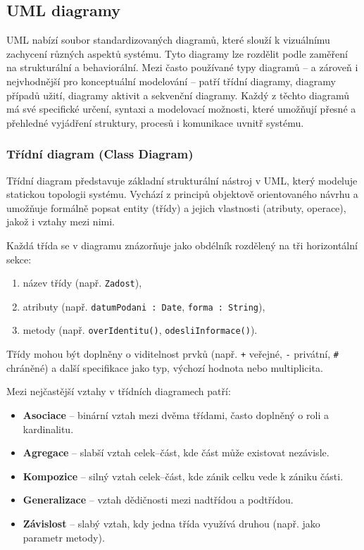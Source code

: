 \subsection{UML diagramy}
\label{sec:uml-diagramy}

UML nabízí soubor standardizovaných diagramů, které slouží k vizuálnímu zachycení různých aspektů systému. Tyto diagramy lze rozdělit podle zaměření na strukturální a  behaviorální. Mezi často používané typy diagramů – a zároveň i nejvhodnější pro konceptuální modelování – patří třídní diagramy, diagramy případů užití, diagramy aktivit a sekvenční diagramy. Každý z těchto diagramů má své specifické určení, syntaxi a modelovací možnosti, které umožňují přesné a přehledné vyjádření struktury, procesů i komunikace uvnitř systému. \cite{PerglUML, Koc2021}


\subsubsection{Třídní diagram (Class Diagram)}
\label{sec:class-diagram}

Třídní diagram představuje základní strukturální nástroj v UML, který modeluje statickou topologii systému. Vychází z principů objektově orientovaného návrhu a umožňuje formálně popsat entity (třídy) a jejich vlastnosti (atributy, operace), jakož i vztahy mezi nimi. \cite{Benabderrezak2024Class}

Každá třída se v diagramu znázorňuje jako obdélník rozdělený na tři horizontální sekce:
\begin{enumerate}
  \item název třídy (např. \texttt{Zadost}),
  \item atributy (např. \texttt{datumPodani : Date}, \texttt{forma : String}),
  \item metody (např. \texttt{overIdentitu()}, \texttt{odesliInformace()}).
\end{enumerate}

Třídy mohou být doplněny o viditelnost prvků (např. \texttt{+} veřejné, \texttt{-} privátní, \texttt{\#} chráněné) a další specifikace jako typ, výchozí hodnota nebo multiplicita.

Mezi nejčastější vztahy v třídních diagramech patří:
\begin{itemize}
  \item \textbf{Asociace} – binární vztah mezi dvěma třídami, často doplněný o roli a kardinalitu.
  \item \textbf{Agregace} – slabší vztah celek–část, kde část může existovat nezávisle.
  \item \textbf{Kompozice} – silný vztah celek–část, kde zánik celku vede k zániku části.
  \item \textbf{Generalizace} – vztah dědičnosti mezi nadtřídou a podtřídou.
  \item \textbf{Závislost} – slabý vztah, kdy jedna třída využívá druhou (např. jako parametr metody).
\end{itemize}

